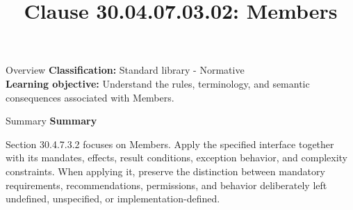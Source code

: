 \documentclass[10pt,letterpaper]{article}
\title{Clause 30.04.07.03.02: Members}
\author{}
\date{}
\begin{document}
\maketitle
\begin{CornellOverviewBox}{Overview}
\textbf{Classification:} Standard library - Normative\\[2pt]
\textbf{Learning objective:} Understand the rules, terminology, and semantic consequences associated with Members.
\end{CornellOverviewBox}\begin{CornellSummaryBox}{Summary}
{\sffamily\bfseries\color{Accent} Summary}\par\vspace{3pt}Section 30.4.7.3.2 focuses on Members. Apply the specified interface together with its mandates, effects, result conditions, exception behavior, and complexity constraints. When applying it, preserve the distinction between mandatory requirements, recommendations, permissions, and behavior deliberately left undefined, unspecified, or implementation-defined.
\end{CornellSummaryBox}
\end{document}
